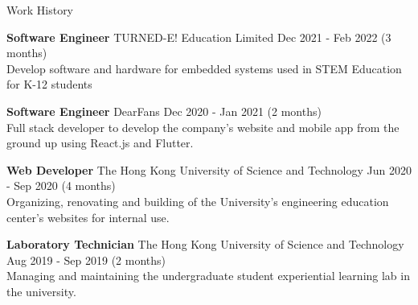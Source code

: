 \documentclass{resume} %
\begin{document}
\begin{rSection}{Work History}
    \vspace{-1.25em}
    \item \textbf{Software Engineer} {TURNED-E! Education Limited} \hfill Dec 2021 - Feb 2022 (3 months) \\
    Develop software and hardware for embedded systems used in STEM Education for K-12 students
    \item \textbf{Software Engineer} {DearFans} \hfill Dec 2020 - Jan 2021 (2 months) \\
    Full stack developer to develop the company's website and mobile app from the ground up using React.js and Flutter.
    \item \textbf{Web Developer} {The Hong Kong University of Science and Technology} \hfill Jun 2020 - Sep 2020 (4 months) \\
    Organizing, renovating and building of the University's engineering education center's websites for internal use.
    \item \textbf{Laboratory Technician} {The Hong Kong University of Science and Technology} \hfill Aug 2019 - Sep 2019 (2 months) \\
    Managing and maintaining the undergraduate student experiential learning lab in the university.
\end{rSection}

\end{document}
